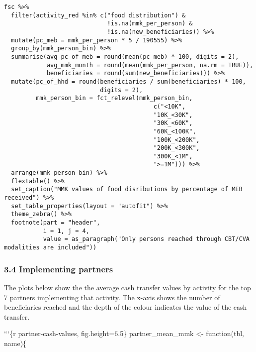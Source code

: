 \documentclass[
]{article}
\begin{document}
\begin{verbatim}
fsc %>% 
  filter(activity_red %in% c("food distribution") &
                             !is.na(mmk_per_person) &
                             !is.na(new_beneficiaries)) %>%
  mutate(pc_meb = mmk_per_person * 5 / 190555) %>% 
  group_by(mmk_person_bin) %>% 
  summarise(avg_pc_of_meb = round(mean(pc_meb) * 100, digits = 2),
            avg_mmk_month = round(mean(mmk_per_person, na.rm = TRUE)),
            beneficiaries = round(sum(new_beneficiaries))) %>% 
  mutate(pc_of_hhd = round(beneficiaries / sum(beneficiaries) * 100, 
                           digits = 2), 
         mmk_person_bin = fct_relevel(mmk_person_bin, 
                                          c("<10K", 
                                          "10K_<30K", 
                                          "30K_<60K", 
                                          "60K_<100K", 
                                          "100K_<200K",
                                          "200K_<300K",
                                          "300K_<1M", 
                                          ">=1M"))) %>% 
  arrange(mmk_person_bin) %>% 
  flextable() %>% 
  set_caption("MMK values of food disributions by percentage of MEB received") %>% 
  set_table_properties(layout = "autofit") %>% 
  theme_zebra() %>% 
  footnote(part = "header",
           i = 1, j = 4, 
           value = as_paragraph("Only persons reached through CBT/CVA modalities are included"))

\end{verbatim}

\hypertarget{implementing-partners}{%
\subsubsection{3.4 Implementing partners}\label{implementing-partners}}

The plots below show the the average cash transfer values by activity
for the top 7 partners implementing that activity. The x-axis shows the
number of beneficiaries reached and the depth of the colour indicates
the value of the cash transfer.

```\{r partner-cash-values, fig.height=6.5\} partner\_mean\_mmk
\textless- function(tbl, name)\{
\end{document}

